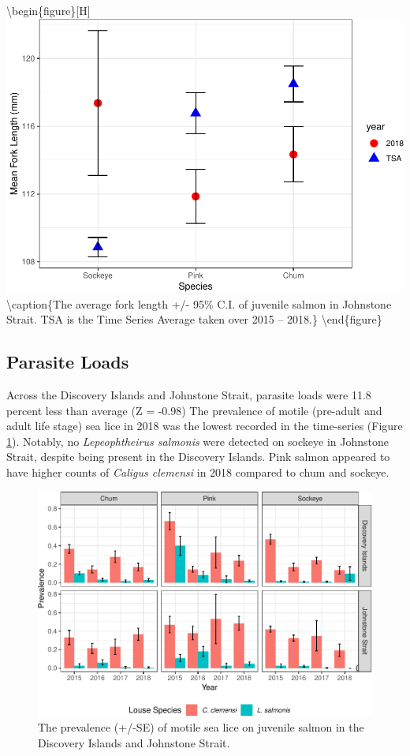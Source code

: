 \documentclass[fleqn,10pt]{wlpeerj} %
\begin{document}
\textbackslash{}begin\{figure\}{[}H{]}
\includegraphics[width=0.8\linewidth]{peer_j_migration_dynamics_files/figure-latex/lengthstatsJS-1}
\textbackslash{}caption\{The average fork length +/- 95\% C.I. of
juvenile salmon in Johnstone Strait. TSA is the Time Series Average
taken over 2015 -- 2018.\}\label{fig:lengthstatsJS}
\textbackslash{}end\{figure\}

\subsection*{Parasite Loads}\label{parasite-loads}

Across the Discovery Islands and Johnstone Strait, parasite loads were
11.8 percent less than average (Z = -0.98) The prevalence of motile
(pre-adult and adult life stage) sea lice in 2018 was the lowest
recorded in the time-series (Figure \ref{fig:sealice}). Notably, no
\emph{Lepeophtheirus salmonis} were detected on sockeye in Johnstone
Strait, despite being present in the Discovery Islands. Pink salmon
appeared to have higher counts of \emph{Caligus clemensi} in 2018
compared to chum and sockeye.

\begin{figure}[H]
\includegraphics[width=0.8\linewidth]{peer_j_migration_dynamics_files/figure-latex/sealice-1} \caption{The prevalence (+/-SE) of motile sea lice on juvenile salmon in the Discovery Islands and Johnstone Strait.}\label{fig:sealice}
\end{figure}
\end{document}
